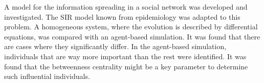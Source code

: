 A model for the information spreading in a social network was developed and investigated. The SIR model known from epidemiology was adapted to this problem. A homogeneous system, where the evolution is described by differential equations, was compared with an agent-based simulation. It was found that there are cases where they significantly differ. In the agent-based simulation, individuals that are way more important than the rest were identified. It was found that the betweenness centrality might be a key parameter to determine such influential individuals. 